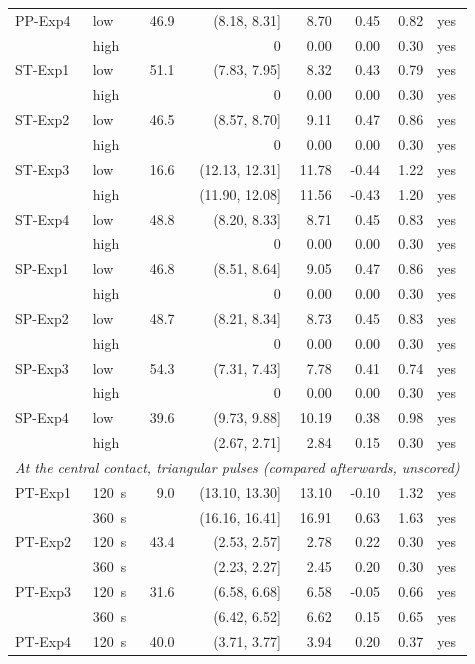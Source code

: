 {\begin{longtable}{llrrrrrl}
PP-Exp4 & low & 46.9 & (8.18, 8.31] & 8.70 & 0.45 & 0.82 & yes \\
 & high &  & 0 & 0.00 & 0.00 & 0.30 & yes \\
ST-Exp1 & low & 51.1 & (7.83, 7.95] & 8.32 & 0.43 & 0.79 & yes \\
 & high &  & 0 & 0.00 & 0.00 & 0.30 & yes \\
ST-Exp2 & low & 46.5 & (8.57, 8.70] & 9.11 & 0.47 & 0.86 & yes \\
 & high &  & 0 & 0.00 & 0.00 & 0.30 & yes \\
ST-Exp3 & low & 16.6 & (12.13, 12.31] & 11.78 & -0.44 & 1.22 & yes \\
 & high &  & (11.90, 12.08] & 11.56 & -0.43 & 1.20 & yes \\
ST-Exp4 & low & 48.8 & (8.20, 8.33] & 8.71 & 0.45 & 0.83 & yes \\
 & high &  & 0 & 0.00 & 0.00 & 0.30 & yes \\
SP-Exp1 & low & 46.8 & (8.51, 8.64] & 9.05 & 0.47 & 0.86 & yes \\
 & high &  & 0 & 0.00 & 0.00 & 0.30 & yes \\
SP-Exp2 & low & 48.7 & (8.21, 8.34] & 8.73 & 0.45 & 0.83 & yes \\
 & high &  & 0 & 0.00 & 0.00 & 0.30 & yes \\
SP-Exp3 & low & 54.3 & (7.31, 7.43] & 7.78 & 0.41 & 0.74 & yes \\
 & high &  & 0 & 0.00 & 0.00 & 0.30 & yes \\
SP-Exp4 & low & 39.6 & (9.73, 9.88] & 10.19 & 0.38 & 0.98 & yes \\
 & high &  & (2.67, 2.71] & 2.84 & 0.15 & 0.30 & yes \\
\midrule
\multicolumn{8}{l}{\textit{At the central contact, triangular pulses (compared afterwards, unscored)}} \\
PT-Exp1 & 120~s & 9.0 & (13.10, 13.30] & 13.10 & -0.10 & 1.32 & yes \\
 & 360~s &  & (16.16, 16.41] & 16.91 & 0.63 & 1.63 & yes \\
PT-Exp2 & 120~s & 43.4 & (2.53, 2.57] & 2.78 & 0.22 & 0.30 & yes \\
 & 360~s &  & (2.23, 2.27] & 2.45 & 0.20 & 0.30 & yes \\
PT-Exp3 & 120~s & 31.6 & (6.58, 6.68] & 6.58 & -0.05 & 0.66 & yes \\
 & 360~s &  & (6.42, 6.52] & 6.62 & 0.15 & 0.65 & yes \\
PT-Exp4 & 120~s & 40.0 & (3.71, 3.77] & 3.94 & 0.20 & 0.37 & yes \\

\end{longtable}}
